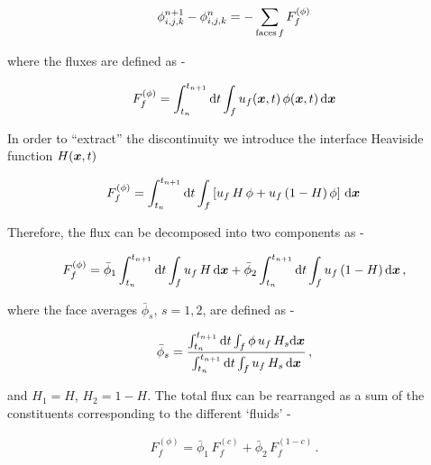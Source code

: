 \begin{align}
\phi_{i,j,k}^{n+1} - \phi_{i,j,k}^{n} = - \sum_{\textrm{faces}\, f} F^{(\phi)}_f 
\label{sumfp}
\end{align}



where the fluxes are defined as -

\begin{align}
	F_f^{(\phi)} = \int_{t_n}^{t_{n+1}} {\textrm {d}}t \int_{f} u_f(\boldsymbol{x},t) \,\phi(\boldsymbol{x},t) \,
	{\textrm {d}}\boldsymbol{x}
\label{pfaceint}
\end{align}

In order to ``extract'' the discontinuity we introduce the 
 interface Heaviside function $ H(\boldsymbol{x},t) $

\begin{align}
F_f^{(\phi)} = 
\int_{t_n}^{t_{n+1}} {\textrm d}t \int_{f} \left[ u_f  \,H \,\phi  +  u_f \,(1-H) \,\phi \right] 
\, {\textrm d}\boldsymbol{x} \, 
\label{fluxphi}
\end{align}

Therefore, the flux can be decomposed into two components as -

\begin{align}
F_f^{(\phi)} = 
\bar \phi_1 \int_{t_n}^{t_{n+1}} {\textrm d}t \int_{f} u_f \,H \,{\textrm d}\boldsymbol{x} + 
\bar \phi_2 \int_{t_n}^{t_{n+1}} {\textrm d}t \int_{f} u_f \,(1-H) \,{\textrm d}\boldsymbol{x} \,,
\label{barphi}
\end{align}

where the face averages $\bar \phi_s$, $s=1,2$, are defined as - 


\begin{align} 
\bar \phi_s = \frac{\int_{t_n}^{t_{n+1}} {\textrm d}t \int_{f} \phi \,u_f \,H_s  
{\textrm d}\boldsymbol{x}}{\int_{t_n}^{t_{n+1}} {\textrm d}t \int_{f}  
u_f \,H_s\,{\textrm d}\boldsymbol{x}} \,,  
\label{barphi2}
\end{align}


and $H_1=H$, $H_2= 1-H$. 
The total flux can be rearranged as a sum of the constituents 
corresponding to the different `fluids' - 


\begin{align}
F_f^{(\phi)} = \bar \phi_1 \,F_f^{(c)} +  \bar \phi_2 \,F_f^{(1-c)} \,.
\label{fluxphi12}
\end{align}



